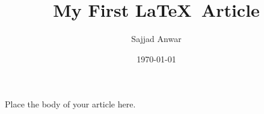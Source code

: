 \documentclass{article}
\title{My First \LaTeX\ Article}
\author{Sajjad Anwar}
\date{\today}
\begin{document}
\maketitle
\newpage
Place the body of your article here.
\end{document}
